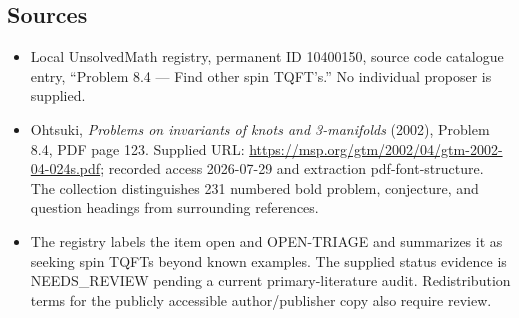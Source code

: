 \documentclass[11pt]{article}
\begin{document}
\subsection{Sources}
\begin{itemize}
\item Local UnsolvedMath registry, permanent ID 10400150, source code catalogue entry, ``Problem 8.4 --- Find other spin TQFT's.'' No individual proposer is supplied.
\item Ohtsuki, \emph{Problems on invariants of knots and 3-manifolds} (2002), Problem 8.4, PDF page 123. Supplied URL: \url{https://msp.org/gtm/2002/04/gtm-2002-04-024s.pdf}; recorded access 2026-07-29 and extraction pdf-font-structure. The collection distinguishes 231 numbered bold problem, conjecture, and question headings from surrounding references.
\item The registry labels the item open and OPEN-TRIAGE and summarizes it as seeking spin TQFTs beyond known examples. The supplied status evidence is NEEDS\_REVIEW pending a current primary-literature audit. Redistribution terms for the publicly accessible author/publisher copy also require review.
\end{itemize}
\end{document}
